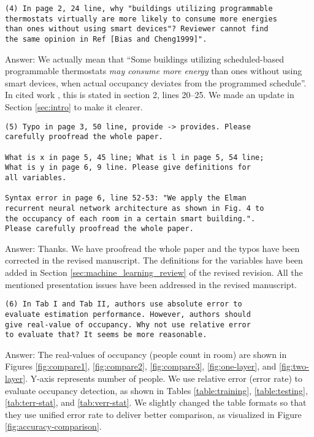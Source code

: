 \begin{verbatim}
(4) In page 2, 24 line, why "buildings utilizing programmable
thermostats virtually are more likely to consume more energies
than ones without using smart devices"? Reviewer cannot find
the same opinion in Ref [Bias and Cheng1999]".
\end{verbatim}
Answer: We actually mean that ``Some buildings utilizing scheduled-based
programmable thermostats \emph{may consume more energy} than ones without using
smart devices, when actual occupancy deviates from the programmed schedule''.
In cited work \cite{bias1999elec}, this is stated in section 2, lines 20--25.
We made an update in Section \ref{sec:intro} to make it clearer.

\begin{verbatim}
(5) Typo in page 3, 50 line, provide -> provides. Please
carefully proofread the whole paper.

What is x in page 5, 45 line; What is l in page 5, 54 line;
What is y in page 6, 9 line. Please give definitions for
all variables.

Syntax error in page 6, line 52-53: "We apply the Elman
recurrent neural network architecture as shown in Fig. 4 to
the occupancy of each room in a certain smart building.".
Please carefully proofread the whole paper.
\end{verbatim}
Answer: Thanks. We have proofread the whole paper and the typos have been corrected in
the revised manuscript. The definitions for the variables have been added in
Section \ref{sec:machine_learning_review} of the revised revision. All the mentioned presentation issues have
been addressed in the revised manuscript.

\begin{verbatim}
(6) In Tab I and Tab II, authors use absolute error to
evaluate estimation performance. However, authors should
give real-value of occupancy. Why not use relative error
to evaluate that? It seems be more reasonable.
\end{verbatim}
Answer: The real-values of occupancy (people count in room) are shown in Figures
\ref{fig:compare1}, \ref{fig:compare2}, \ref{fig:compare3},
\ref{fig:one-layer}, and \ref{fig:two-layer}. Y-axis represents number of
people. We use relative error (error rate) to evaluate occupancy detection, as
shown in Tables \ref{table:training}, \ref{table:testing}, \ref{tab:terr-stat},
and \ref{tab:verr-stat}. We slightly changed the table formats so that they use
unified error rate to deliver better comparison, as visualized in Figure
\ref{fig:accuracy-comparison}.


